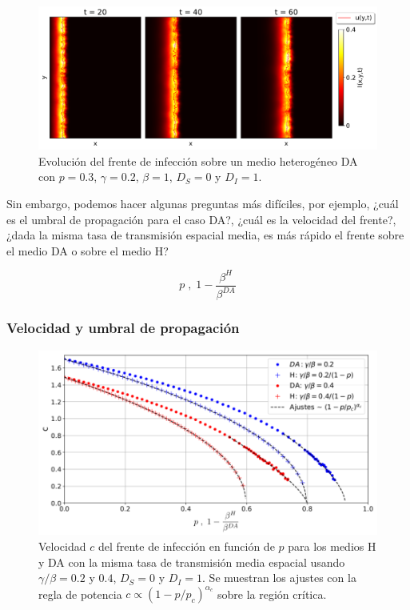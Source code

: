 \begin{figure}[b]
    \centering
    \includegraphics[width=\imsizeL]{da_case.pdf}
    \caption[Representación del campo de infectados y evolución del centro de masa en medio DA.]{Evolución del frente de infección sobre un medio heterogéneo DA con $p=0.3$, $\gamma=0.2$, $\beta=1$, $D_S = 0$ y $D_{I}=1$.}
    \label{fig:da}
\end{figure}

Sin embargo, podemos hacer algunas preguntas más difíciles, por ejemplo, ¿cuál es el umbral de propagación para el caso DA?, ¿cuál es la velocidad del frente?,
¿dada la misma tasa de transmisión espacial media, es más rápido el frente sobre el medio DA o sobre el medio H? 

\begin{equation}
    p\;,\;1 - \frac{\beta^H}{\beta ^{DA}}
\end{equation}

\subsubsection*{Velocidad y umbral de propagación}

\begin{figure}[!b]
    \centering
    \includegraphics[width=\imsizeL]{cc.png}
    \caption[Velocidad del frente infección en función del parámetro de desorden $p$.]{Velocidad $c$ del frente de infección en función de $p$ para los medios H y DA con la misma tasa de transmisión media espacial usando $\gamma/\beta=0.2$ y $0.4$, $D_S=0$ y $D_{I}=1$. Se muestran los ajustes con la regla de potencia $c\propto(1-p/p_c)^{\alpha_c}$ sobre la región crítica.}
    \label{fig:velocidad_p}
\end{figure}

